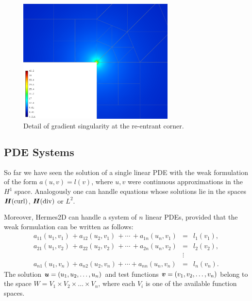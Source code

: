 \documentclass[11pt]{article}
\newcommand{\bfu}{\mbox{\boldmath $u$}}
\newcommand{\bfv}{\mbox{\boldmath $v$}}
\newcommand{\bfH}{\mbox{\boldmath $H$}}
\def\Hcurl{{\bfH({\rm curl})}}
\def\Hdiv{{\bfH({\rm div})}}
\begin{document}
\begin{figure}[!ht]
  \centering\medskip
  \includegraphics[width=0.7\textwidth]{img/newton2.png}
  \caption{Detail of gradient singularity at the re-entrant corner.}
  \label{fig:newton2}
\end{figure}




\subsection{PDE Systems}
\label{sec:systems}


So far we have seen the solution of a single linear PDE with the weak formulation
of the form $a(u,v) = l(v)$, where $u, v$ were continuous approximations in the
$H^1$ space. Analogously one can handle equations whose solutions lie in the spaces
$\Hcurl$, $\Hdiv$ or $L^2$.

Moreover, Hermes2D can handle a system of $n$ linear
PDEs, provided that the weak formulation can be written as follows:
\begin{eqnarray}
  a_{11}(u_1,v_1)\,+ a_{12}(u_2,v_1)\,+ \cdots\,+ a_{1n}(u_n,v_1) &=& l_1(v_1), \nonumber \\
  a_{21}(u_1,v_2)\,+ a_{22}(u_2,v_2)\,+ \cdots\,+ a_{2n}(u_n,v_2) &=& l_2(v_2), \label{weaksystem} \\
                                                      &\vdots&     \nonumber  \\
  a_{n1}(u_1,v_n) + a_{n2}(u_2,v_n) + \cdots + a_{nn}(u_n,v_n) &=& l_n(v_n). \nonumber
\end{eqnarray}
The solution $\bfu = (u_1, u_2, \dots, u_n)$ and test functions $\bfv =
(v_1, v_2, \dots, v_n)$ belong to the space $W = V_1 \times V_2 \times \dots
\times V_n$, where each $V_i$ is one of the available function spaces.
\end{document}
